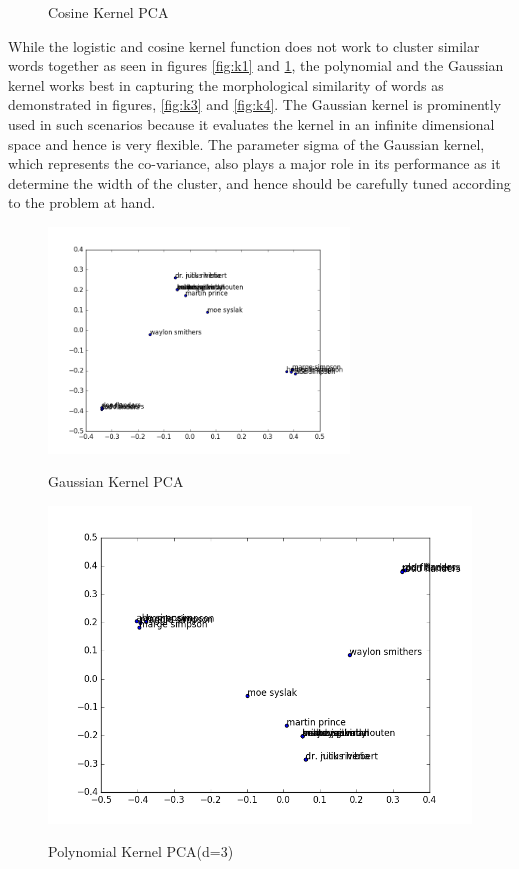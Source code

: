 \begin{figure}[H]
\begin{minipage}[b]{0.5\linewidth}
		\caption{Cosine Kernel PCA} 
		\vspace{4ex}\label{fig:k2}
	\end{minipage} 
\end{figure}
While the logistic and cosine kernel function does not work to cluster similar words together as seen in figures \ref{fig:k1} and \ref{fig:k2}, the polynomial and the Gaussian kernel works best in capturing the morphological similarity of words as demonstrated in figures, \ref{fig:k3} and \ref{fig:k4}. The Gaussian kernel is prominently used in such scenarios because it evaluates the kernel in an infinite dimensional space and hence is very flexible. The parameter sigma of the Gaussian kernel, which represents the co-variance, also plays a major role in its performance as it determine the width of the cluster, and hence should be carefully tuned according to the problem at hand.
\begin{figure}[H]
	\begin{minipage}[b]{0.5\linewidth}
		\centering
		\includegraphics[width=1\linewidth,height=6cm]{files//KERNELPCA/gauss.png} 
		\caption{Gaussian Kernel PCA} 
		\vspace{4ex}\label{fig:k3}
	\end{minipage}%
	\begin{minipage}[b]{0.5\linewidth}
		\centering
		\includegraphics[width=1\linewidth]{files//KERNELPCA/poly.png} 
		\caption{Polynomial Kernel PCA(d=3)} 
		\vspace{4ex}\label{fig:k4}
	\end{minipage} 
	\label{fig:varKernel}
\end{figure}
